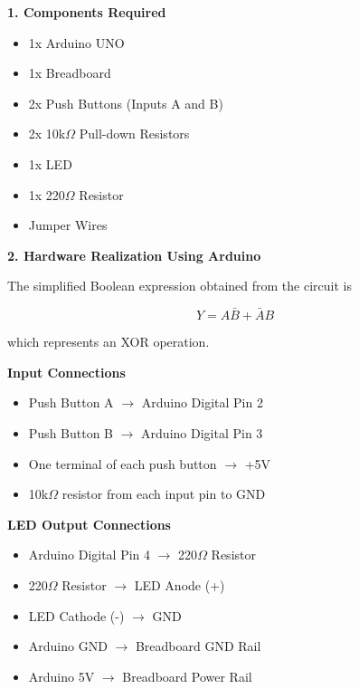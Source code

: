 \documentclass[12pt,a4paper]{article}
\begin{document}
\begin{hardwarebox}

\textbf{1. Components Required}

\begin{itemize}[itemsep=0.1em]
\item 1x Arduino UNO
\item 1x Breadboard
\item 2x Push Buttons (Inputs A and B)
\item 2x 10k$\Omega$ Pull-down Resistors
\item 1x LED
\item 1x 220$\Omega$ Resistor
\item Jumper Wires
\end{itemize}

\vspace{0.4cm}

\textbf{2. Hardware Realization Using Arduino}

The simplified Boolean expression obtained from the circuit is

\[
Y=A\bar B+\bar AB
\]

which represents an XOR operation.

\vspace{0.3cm}

\textbf{Input Connections}

\begin{itemize}[itemsep=0.1em]
\item Push Button A $\rightarrow$ Arduino Digital Pin 2
\item Push Button B $\rightarrow$ Arduino Digital Pin 3
\item One terminal of each push button $\rightarrow$ +5V
\item 10k$\Omega$ resistor from each input pin to GND
\end{itemize}

\vspace{0.3cm}

\textbf{LED Output Connections}

\begin{itemize}[itemsep=0.1em]
\item Arduino Digital Pin 4 $\rightarrow$ 220$\Omega$ Resistor
\item 220$\Omega$ Resistor $\rightarrow$ LED Anode (+)
\item LED Cathode (-) $\rightarrow$ GND
\item Arduino GND $\rightarrow$ Breadboard GND Rail
\item Arduino 5V $\rightarrow$ Breadboard Power Rail
\end{itemize}


\end{hardwarebox}
\end{document}
